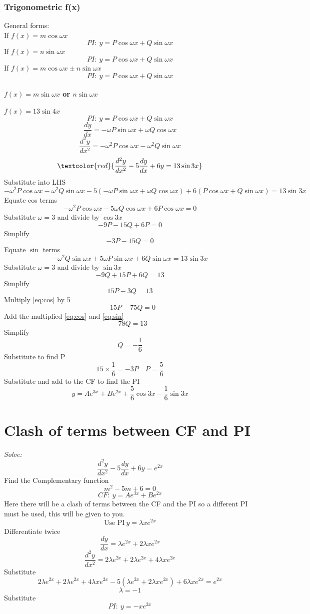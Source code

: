 \documentclass{article}[18pt]
\begin{document}
\subsubsection{Trigonometric f(x)}
General forms:\\
If $f(x)=m\cos\omega x$
$$PI: \ y=P\cos\omega x+Q\sin\omega x$$
If $f(x)=n\sin\omega x$
$$PI: \ y=P\cos\omega x+Q\sin\omega x$$
If $f(x)=m\cos\omega x\pm n\sin\omega x$
$$PI: \ y=P\cos\omega x+Q\sin\omega x$$
\paragraph{$f(x)=m\sin\omega x$ or $n\sin\omega x$}
$f(x)=13\sin4x$
$$PI: \ y=P\cos\omega x+Q\sin\omega x$$
$$\frac{dy}{dx}=-\omega P\sin\omega x+\omega Q\cos\omega x$$
$$\frac{d^2y}{dx^2}=-\omega^2P\cos\omega x-\omega^2Q\sin\omega x$$
$$\textcolor{red}{\frac{d^2y}{dx^2}-5\frac{dy}{dx}+6y=13\sin3x}$$
Substitute into LHS
$$-\omega^2P\cos\omega x-\omega^2Q\sin\omega x-5(-\omega P\sin\omega x+\omega Q\cos\omega x)+6(P\cos\omega x+Q\sin\omega x)=13\sin3x$$
Equate cos terms
$$-\omega^2 P\cos\omega x-5\omega Q\cos\omega x+6P\cos\omega x=0$$
Substitute $\omega=3$ and divide by $\cos3x$
$$-9P-15Q+6P=0$$
Simplify
\begin{equation}\label{eq:cos}
-3P-15Q=0
\end{equation}
Equate $\sin$ terms
$$-\omega^2Q\sin\omega x+5\omega P\sin\omega x+6Q\sin\omega x=13\sin3x$$
Substitute $\omega=3$ and divide by $\sin3x$
$$-9Q+15P+6Q=13$$
Simplify
\begin{equation}\label{eq:sin}
15P-3Q=13
\end{equation}
Multiply \eqref{eq:cos} by 5
$$-15P-75Q=0$$
Add the multiplied \eqref{eq:cos} and \eqref{eq:sin}
$$-78Q=13$$
Simplify
$$Q=-\frac{1}{6}$$
Substitute to find P
$$15\times\frac{1}{6}=-3P \quad P=\frac{5}{6}$$
Substitute and add to the CF to find the PI
$$y=Ae^{3x}+Be^{2x}+\frac{5}{6}\cos3x-\frac{1}{6}\sin3x$$
\newpage
\section{Clash of terms between CF and PI}
\textit{Solve:}
$$\frac{d^2y}{dx^2}-5\frac{dy}{dx}+6y=e^{2x}$$
Find the Complementary function
$$m^2-5m+6=0$$
$$CF: \ y=Ae^{3x}+Be^{2x}$$
Here there will be a clash of terms between the CF and the PI so a different PI must be used, this will be given to you.
$$\textrm{Use PI} \ y=\lambda xe^{2x}$$
Differentiate twice
$$\frac{dy}{dx}=\lambda e^{2x}+2\lambda xe^{2x}$$
$$\frac{d^2y}{dx^2}=2\lambda e^{2x}+2\lambda e^{2x}+4\lambda xe^{2x}$$
Substitute 
$$2\lambda e^{2x}+2\lambda e^{2x}+4\lambda xe^{2x}-5(\lambda e^{2x}+2\lambda xe^{2x})+6\lambda xe^{2x}=e^{2x}$$
$$\lambda=-1$$
Substitute
$$PI: \ y=-xe^{2x}$$
\end{document}
